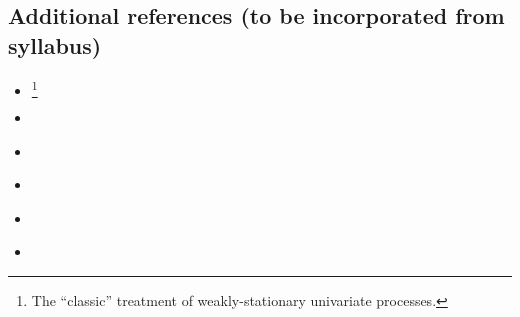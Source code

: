 \subsection{Additional references (to be incorporated from syllabus)}
\begin{itemize}
\item \citet{BD91}%
\footnote{The ``classic'' treatment of weakly-stationary univariate
  processes.} %
\item \citet{FR07}
\item \citet{Ki13}
\item \citet{Si80}
\item \citet{SW01}
\item \citet{Wa94}
\end{itemize}

